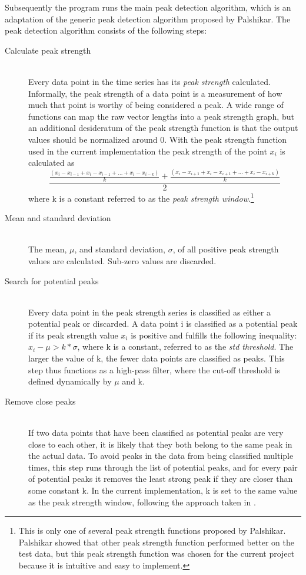 Subsequently the program runs the main peak detection algorithm, which is an adaptation of the generic peak detection algorithm proposed by Palshikar\cite{stepDetection}. The peak detection algorithm consists of the following steps:
\begin{description}

\item[Calculate peak strength] \hfill \\
Every data point in the time series has its \emph{peak strength} calculated. Informally, the peak strength of a data point is a measurement of how much that point is worthy of being considered a peak. A wide range of functions can map the raw vector lengths into a peak strength graph, but an additional desideratum of the peak strength function is that the output values should be normalized around 0. With the peak strength function used in the current implementation the peak strength of the point $x_i$ is calculated as $$\frac{\frac{(x_{i} - x_{i-1} + x_{i} - x_{i-1} + \ldots + x_{i} - x_{i-k})}{k} + \frac{(x_{i} - x_{i+1} + x_{i} - x_{i+1} + \ldots + x_{i} - x_{i+k})}{k}}{2}$$ where k is a constant referred to as the \emph{peak strength window}.\footnote{This is only one of several peak strength functions proposed by Palshikar\cite{stepDetection}. Palshikar showed that other peak strength function performed better on the test data, but this peak strength function was chosen for the current project because it is intuitive and easy to implement.} 

\item [Mean and standard deviation] \hfill \\
The mean, $\mu$, and standard deviation, $\sigma$, of all positive peak strength values are calculated. Sub-zero values are discarded.

\item[Search for potential peaks] \hfill \\
Every data point in the peak strength series is classified as either a potential peak or discarded. A data point i is classified as a potential peak if its peak strength value $x_i$ is positive and fulfills the following inequality: $x_i - \mu > k * \sigma$, where k is a constant, referred to as the \emph{std threshold}. The larger the value of k, the fewer data points are classified as peaks. This step thus functions as a high-pass filter, where the cut-off threshold is defined dynamically by $\mu$ and k.

\item[Remove close peaks] \hfill \\
If two data points that have been classified as potential peaks are very close to each other, it is likely that they both belong to the same peak in the actual data. To avoid peaks in the data from being classified multiple times, this step runs through the list of potential peaks, and for every pair of potential peaks it removes the least strong peak if they are closer than some constant k. In the current implementation, k is set to the same value as the peak strength window, following the approach taken in \cite{stepDetection}
.

\end{description}

